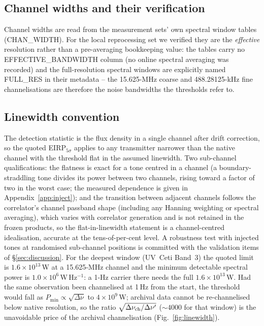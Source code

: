 \documentclass{openjournal}
\begin{document}
\subsection*{Channel widths and their verification}

Channel widths are read from the measurement sets' own spectral window
tables (CHAN\_WIDTH). For the local reprocessing set we verified they
are the \emph{effective} resolution rather than a pre-averaging
bookkeeping value: the tables carry no EFFECTIVE\_BANDWIDTH column
(no online spectral averaging was recorded) and the full-resolution
spectral windows are explicitly named FULL\_RES in their metadata --
the 15.625-MHz coarse and 488.28125-kHz fine channelisations are
therefore the noise bandwidths the thresholds refer to.

\subsection*{Linewidth convention}

The detection statistic is the flux density in a single channel after
drift correction, so the quoted EIRP$_{5\sigma}$ applies to any
transmitter narrower than the native channel with the threshold flat
in the assumed linewidth. Two sub-channel qualifications: the flatness
is exact for a tone centred in a channel (a boundary-straddling tone
divides its power between two channels, rising toward a factor of two
in the worst case; the measured dependence is given in
Appendix~\ref{app:inject}); and the transition between adjacent
channels follows the correlator's channel passband shape (including
any Hanning weighting or spectral averaging), which varies with
correlator generation and is not retained in the frozen products, so
the flat-in-linewidth statement is a channel-centred idealisation,
accurate at the tens-of-per-cent level. A robustness test with
injected tones at randomised sub-channel positions is committed with
the validation items of \S\ref{sec:discussion}. For the deepest
window (UV~Ceti Band~3) the quoted limit is
$1.6\times10^{13}$\,W at a 15.625-MHz channel and the minimum
detectable spectral power is $1.0\times10^{6}$\,W\,Hz$^{-1}$: a 1-Hz
carrier there needs the full $1.6\times10^{13}$\,W. Had the same
observation been channelised at 1\,Hz from the start, the threshold
would fall as $P_{\min} \propto \sqrt{\Delta\nu}$ to
$4\times10^{9}$\,W; archival data cannot be re-channelised below
native resolution, so the ratio
$\sqrt{\Delta\nu_{\rm ch}/\Delta\nu'}$ (${\sim}4000$ for that window)
is the unavoidable price of the archival channelisation
(Fig.~\ref{fig:linewidth}).
\end{document}
